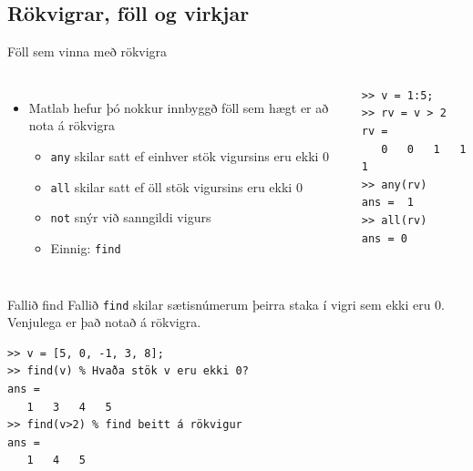 \documentclass{beamer}
\begin{document}
\subsection{Rökvigrar, föll og virkjar}
\begin{frame}[fragile]{Föll sem vinna með rökvigra}
\begin{columns}
\begin{itemize}
 \item Matlab hefur þó nokkur innbyggð föll sem hægt er að nota á rökvigra
 \begin{itemize}
  \item \texttt{any} skilar satt ef einhver stök vigursins eru ekki $0$
  \item \texttt{all} skilar satt ef öll stök vigursins eru ekki $0$
  \item \texttt{not} snýr við sanngildi vigurs
  \item Einnig: \texttt{find}
 \end{itemize}
\end{itemize}
\begin{verbatim}
>> v = 1:5;
>> rv = v > 2
rv =
   0   0   1   1   1
>> any(rv)
ans =  1
>> all(rv)
ans = 0
\end{verbatim}
\end{columns}
\end{frame}

\begin{frame}[fragile]{Fallið find}
Fallið \texttt{find} skilar sætisnúmerum þeirra staka í vigri sem ekki eru 0. Venjulega er það notað á rökvigra.
\begin{verbatim}
>> v = [5, 0, -1, 3, 8];
>> find(v) % Hvaða stök v eru ekki 0?
ans =
   1   3   4   5
>> find(v>2) % find beitt á rökvigur
ans =
   1   4   5
\end{verbatim}
\end{frame}
\end{document}
